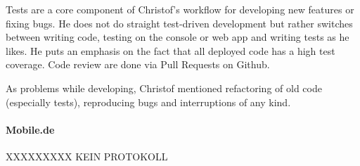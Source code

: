 Tests are a core component of Christof's workflow for developing new features or fixing bugs. He does not do straight test-driven development but rather switches between writing code, testing on the console or web app and writing tests as he likes. He puts an emphasis on the fact that all deployed code has a high test coverage. Code review are done via Pull Requests on Github.

As problems while developing, Christof mentioned refactoring of old code (especially tests), reproducing bugs and interruptions of any kind.

\paragraph{Mobile.de}

XXXXXXXXX KEIN PROTOKOLL